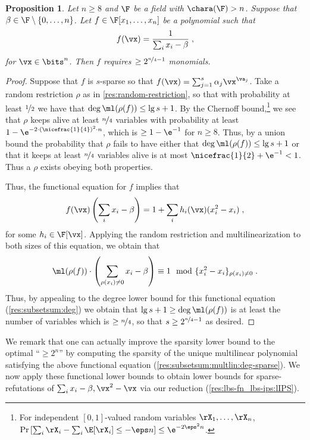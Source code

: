 \documentclass[11pt]{article}
\numberwithin{equation}{section}
\newtheorem{proposition}[theorem]{Proposition}
\theoremstyle{definition}
\theoremstyle{plain}
\begin{document}
\begin{proposition}
        Let $n\ge 8$ and $\F$ be a field with $\chara(\F)>n$.  Suppose that $\beta\in \F\setminus\{0,\ldots,n\}$.  Let $f\in\F[x_1,\ldots,x_n]$ be a polynomial such that
        \[
                f(\vx)=\frac{1}{\sum_i x_i-\beta}
                \;,
        \]
        for $\vx\in\bits^n$. Then $f$ requires $\ge 2^{\nicefrac{n}{4}-1}$ monomials.
\end{proposition}
\begin{proof}
        Suppose that $f$ is $s$-sparse so that $f(\vx)=\sum_{j=1}^s \alpha_j\vx^{\va_j}$. Take a random restriction $\rho$ as in \autoref{res:random-restriction}, so that with probability at least $\nicefrac{1}{2}$ we have that $\deg \ml(\rho(f))\le \lg s+1$.  By the Chernoff bound,\footnote{For independent $[0,1]$-valued random variables $\rX_1,\ldots,\rX_n$, $\Pr\left[\sum_i \rX_i -\sum_i\E[\rX_i]\le-\eps n\right]\le \e^{-2\eps^2n}$.} we see that $\rho$ keeps alive at least $\nicefrac{n}{4}$ variables with probability at least $1-\e^{-2\cdot (\nicefrac{1}{4})^2\cdot n}$, which is $\ge 1-\e^{-1}$ for $n\ge 8$.
        Thus, by a union bound the probability that $\rho$ fails to have either that $\deg\ml(\rho(f))\le \lg s+1$ or that it keeps at least $\nicefrac{n}{4}$ variables alive is at most $\nicefrac{1}{2}+\e^{-1}<1$.  Thus a $\rho$ exists obeying both properties.

        Thus, the functional equation for $f$ implies that
        \[
                f(\vx)\left(\sum_i x_i-\beta\right)=1+\sum_i h_i(\vx) (x_i^2-x_i)
                \;,
        \]
        for some $h_i\in\F[\vx]$.  Applying the random restriction and multilinearization to both sizes of this equation, we obtain that
        \[
                \ml(\rho(f))\cdot \left(\sum_{\rho(x_i)\ne 0} x_i-\beta\right)\equiv 1 \mod \{x_i^2-x_i\}_{\rho(x_i)\ne 0}
                \;.
        \]
        Thus, by appealing to the degree lower bound for this functional equation (\autoref{res:subsetsum:deg}) we obtain that $\lg s+1\ge \deg\ml(\rho(f))$ is at least the number of variables which is $\ge \nicefrac{n}{4}$, so that $s\ge 2^{\nicefrac{n}{4}-1}$ as desired.
\end{proof}

We remark that one can actually improve the sparsity lower bound to the optimal ``$\ge 2^n$'' by computing the sparsity of the unique multilinear polynomial satisfying the above functional equation (\autoref{res:subsetsum:multlin:deg-sparse}). We now apply these functional lower bounds to obtain lower bounds for sparse-\lIPS refutations of $\sum_i x_i-\beta,\vx^2-\vx$ via our reduction (\autoref{res:lbs-fn_lbs-ips:lIPS}).
\end{document}
